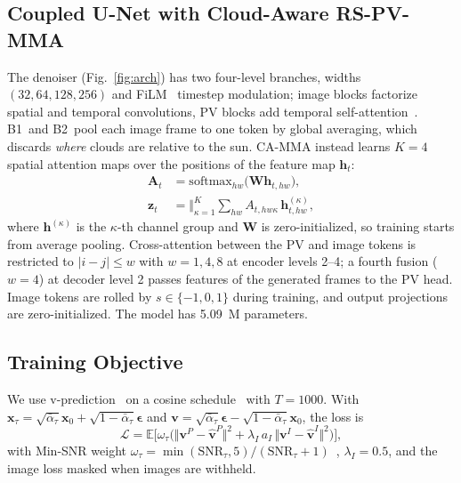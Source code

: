 \documentclass[conference]{IEEEtran}
\newcommand{\BOne}{B1}
\newcommand{\BTwo}{B2}
\begin{document}
\subsection{Coupled U-Net with Cloud-Aware RS-PV-MMA}
The denoiser (Fig.~\ref{fig:arch}) has two four-level branches, widths $(32,64,128,256)$ and FiLM~\cite{perez2018film} timestep modulation; image blocks factorize spatial and temporal convolutions, PV blocks add temporal self-attention~\cite{vaswani2017attention}. \BOne\ and \BTwo\ pool each image frame to one token by global averaging, which discards \emph{where} clouds are relative to the sun. CA-MMA instead learns $K=4$ spatial attention maps over the positions of the feature map $\mathbf h_{t}$:
\begin{equation}
\begin{aligned}
\mathbf A_{t}&=\mathrm{softmax}_{hw}\big(\mathbf W\mathbf h_{t,hw}\big),\\
\mathbf z_t&=\big\Vert_{\kappa=1}^{K}\textstyle\sum_{hw}A_{t,hw\kappa}\,\mathbf h^{(\kappa)}_{t,hw},
\end{aligned}
\end{equation}
where $\mathbf h^{(\kappa)}$ is the $\kappa$-th channel group and $\mathbf W$ is zero-initialized, so training starts from average pooling. Cross-attention between the PV and image tokens is restricted to $|i-j|\le w$ with $w=1,4,8$ at encoder levels 2--4; a fourth fusion ($w=4$) at decoder level 2 passes features of the generated frames to the PV head. Image tokens are rolled by $s\in\{-1,0,1\}$ during training, and output projections are zero-initialized. The model has \SI{5.09}{M} parameters.

\subsection{Training Objective}
We use v-prediction~\cite{salimans2022progressive} on a cosine schedule~\cite{nichol2021improved} with $T=1000$. With $\mathbf x_\tau=\sqrt{\bar\alpha_\tau}\mathbf x_0+\sqrt{1-\bar\alpha_\tau}\bm\epsilon$ and $\mathbf v=\sqrt{\bar\alpha_\tau}\bm\epsilon-\sqrt{1-\bar\alpha_\tau}\mathbf x_0$, the loss is
\begin{equation}
\mathcal L=\mathbb E\Big[\omega_\tau\big(\Vert\mathbf v^P-\hat{\mathbf v}^P\Vert^2+\lambda_I\,a_I\,\Vert\mathbf v^I-\hat{\mathbf v}^I\Vert^2\big)\Big],
\end{equation}
with Min-SNR weight $\omega_\tau=\min(\mathrm{SNR}_\tau,5)/(\mathrm{SNR}_\tau+1)$~\cite{hang2023minsnr}, $\lambda_I=0.5$, and the image loss masked when images are withheld.
\end{document}
